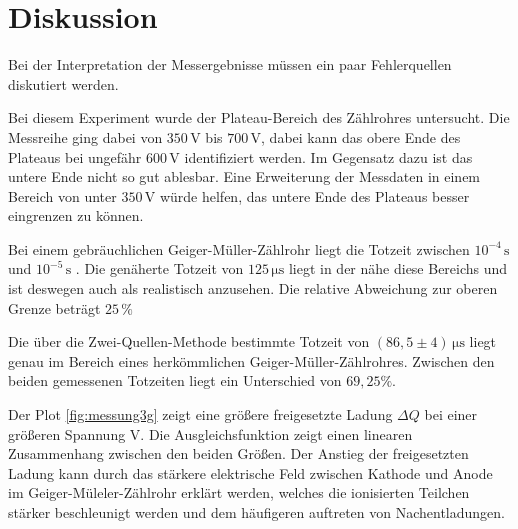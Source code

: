 \section{Diskussion}
\label{sec:Diskussion}

Bei der Interpretation der Messergebnisse müssen ein paar Fehlerquellen diskutiert werden.

Bei diesem Experiment wurde der Plateau-Bereich des Zählrohres untersucht. Die Messreihe ging dabei von $350 \,\unit{\volt}$ bis $700 \,\unit{\volt}$, dabei kann das obere Ende des Plateaus bei ungefähr $600 \, \unit{\volt}$ identifiziert werden.
Im Gegensatz dazu ist das untere Ende nicht so gut ablesbar. Eine Erweiterung der Messdaten in einem Bereich von unter $350 \, \unit{\volt}$ würde helfen, das untere Ende des Plateaus besser eingrenzen zu können.

Bei einem gebräuchlichen Geiger-Müller-Zählrohr liegt die Totzeit zwischen $10^{-4} \, \unit{\second}$ und $10^{-5} \, \unit{\second}$ \cite{ap01}.
Die genäherte Totzeit von $ 125 \,\unit{\micro\second}$ liegt in der nähe diese Bereichs und ist deswegen auch als realistisch anzusehen.
Die relative Abweichung zur oberen Grenze beträgt $25 \, \% $

Die über die Zwei-Quellen-Methode bestimmte Totzeit von $ \left( 86,5 \pm 4 \right) \,\unit{\micro\second}$ liegt genau im Bereich eines herkömmlichen Geiger-Müller-Zählrohres.
Zwischen den beiden gemessenen Totzeiten liegt ein Unterschied von $ 69,25 \% .$

Der Plot \autoref{fig:messung3g} zeigt eine größere freigesetzte Ladung $\Delta Q $ bei einer größeren Spannung $ \unit{\volt}$. Die Ausgleichsfunktion zeigt einen linearen Zusammenhang zwischen den beiden Größen.
Der Anstieg der freigesetzten Ladung kann durch das stärkere elektrische Feld zwischen Kathode und Anode im Geiger-Müleler-Zählrohr erklärt werden, welches die ionisierten Teilchen stärker beschleunigt werden und dem häufigeren auftreten von Nachentladungen.